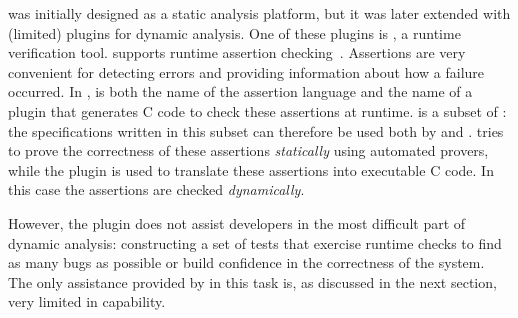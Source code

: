 \framac was initially designed as a static analysis platform, but it was later extended with (limited) plugins for dynamic analysis.
One of these plugins is \eacsl, a runtime verification tool.
\eacsl supports runtime assertion checking~\cite{CR2006:SEN}.
Assertions are very convenient for detecting errors and providing information about how a failure occurred.
In \framac, \eacsl is both the name of the assertion language and the name of a plugin that generates C code to check these assertions at runtime.
\eacsl is a subset of \acsl: the specifications written in this subset can therefore be used both by \Wp and \eacsl.
\Wp tries to prove the correctness of these assertions {\em statically} using automated provers, while the plugin \eacsl is used to translate these assertions into executable C code.
In this case the assertions are checked {\em dynamically}.

However, the \eacsl plugin does not assist developers in the most difficult part of dynamic analysis:  constructing a set of tests that exercise runtime checks to find as many bugs as possible or build confidence in the correctness of the system.  The only assistance provided by \framac in this task is, as discussed in the next section, very limited in capability.